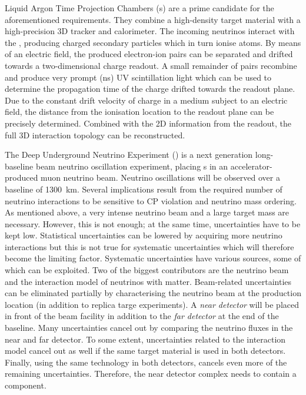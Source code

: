 Liquid Argon Time Projection Chambers (\lartpc{}s) are a prime candidate for the aforementioned requirements.
They combine a high-density target material with a high-precision 3D tracker and calorimeter.
The incoming neutrinos interact with the \lar{}, producing charged secondary particles which in turn ionise  atoms.
By means of an electric field, the produced electron-ion pairs can be separated and drifted towards a two-dimensional charge readout.
A small remainder of pairs recombine and produce very prompt (\si{\nano\second}) UV scintillation light which can be used to determine the propagation time of the charge drifted towards the readout plane.
Due to the constant drift velocity of charge in a medium subject to an electric field, the distance from the ionisation location to the readout plane can be precisely determined.
Combined with the 2D information from the readout, the full 3D interaction topology can be reconstructed.

The Deep Underground Neutrino Experiment (\dune{}) is a next generation long-baseline beam neutrino oscillation experiment, placing \lartpc{}s in an accelerator-produced muon neutrino beam.
Neutrino oscillations will be observed over a baseline of \SI{1300}{\kilo\metre}.
Several implications result from the required number of neutrino interactions to be sensitive to CP violation and neutrino mass ordering.
As mentioned above, a very intense neutrino beam and a large target mass are necessary.
However, this is not enough; at the same time, uncertainties have to be kept low.
Statistical uncertainties can be lowered by acquiring more neutrino interactions but this is not true for systematic uncertainties which will therefore become the limiting factor.
Systematic uncertainties have various sources, some of which can be exploited.
Two of the biggest contributors are the neutrino beam and the interaction model of neutrinos with matter.
Beam-related uncertainties can be eliminated partially by characterising the neutrino beam at the production location (in addition to replica targe experiments).
A \emph{near detector} will be placed in front of the beam facility in addition to the \emph{far detector} at the end of the baseline.
Many uncertainties cancel out by comparing the neutrino fluxes in the near and far detector.
To some extent, uncertainties related to the interaction model cancel out as well if the same target material is used in both detectors.
Finally, using the same technology in both detectors, cancels even more of the remaining uncertainties.
Therefore, the near detector complex needs to contain a \lartpc{} component.

